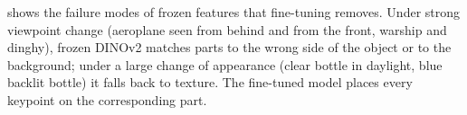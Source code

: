  shows the failure modes of frozen features that fine-tuning removes. Under strong viewpoint change (aeroplane seen from behind and from the front, warship and dinghy), frozen DINOv2 matches parts to the wrong side of the object or to the background; under a large change of appearance (clear bottle in daylight, blue backlit bottle) it falls back to texture. The fine-tuned model places every keypoint on the corresponding part.

